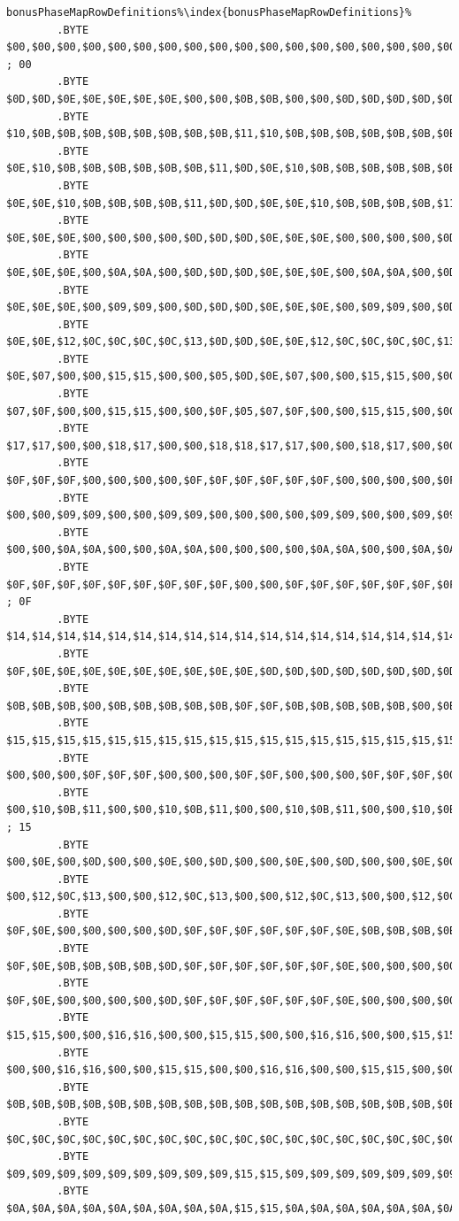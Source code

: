 \begin{lstlisting}[basicstyle=\tiny\ttfamily,escapechar=\%]
bonusPhaseMapRowDefinitions%\index{bonusPhaseMapRowDefinitions}%   
        .BYTE $00,$00,$00,$00,$00,$00,$00,$00,$00,$00,$00,$00,$00,$00,$00,$00,$00,$00,$00,$00 ; 00
        .BYTE $0D,$0D,$0E,$0E,$0E,$0E,$0E,$00,$00,$0B,$0B,$00,$00,$0D,$0D,$0D,$0D,$0D,$0E,$0E 
        .BYTE $10,$0B,$0B,$0B,$0B,$0B,$0B,$0B,$0B,$11,$10,$0B,$0B,$0B,$0B,$0B,$0B,$0B,$0B,$11
        .BYTE $0E,$10,$0B,$0B,$0B,$0B,$0B,$0B,$11,$0D,$0E,$10,$0B,$0B,$0B,$0B,$0B,$0B,$11,$0D
        .BYTE $0E,$0E,$10,$0B,$0B,$0B,$0B,$11,$0D,$0D,$0E,$0E,$10,$0B,$0B,$0B,$0B,$11,$0D,$0D
        .BYTE $0E,$0E,$0E,$00,$00,$00,$00,$0D,$0D,$0D,$0E,$0E,$0E,$00,$00,$00,$00,$0D,$0D,$0D
        .BYTE $0E,$0E,$0E,$00,$0A,$0A,$00,$0D,$0D,$0D,$0E,$0E,$0E,$00,$0A,$0A,$00,$0D,$0D,$0D
        .BYTE $0E,$0E,$0E,$00,$09,$09,$00,$0D,$0D,$0D,$0E,$0E,$0E,$00,$09,$09,$00,$0D,$0D,$0D
        .BYTE $0E,$0E,$12,$0C,$0C,$0C,$0C,$13,$0D,$0D,$0E,$0E,$12,$0C,$0C,$0C,$0C,$13,$0D,$0D
        .BYTE $0E,$07,$00,$00,$15,$15,$00,$00,$05,$0D,$0E,$07,$00,$00,$15,$15,$00,$00,$05,$0D
        .BYTE $07,$0F,$00,$00,$15,$15,$00,$00,$0F,$05,$07,$0F,$00,$00,$15,$15,$00,$00,$0F,$05
        .BYTE $17,$17,$00,$00,$18,$17,$00,$00,$18,$18,$17,$17,$00,$00,$18,$17,$00,$00,$18,$18
        .BYTE $0F,$0F,$0F,$00,$00,$00,$00,$0F,$0F,$0F,$0F,$0F,$0F,$00,$00,$00,$00,$0F,$0F,$0F
        .BYTE $00,$00,$09,$09,$00,$00,$09,$09,$00,$00,$00,$00,$09,$09,$00,$00,$09,$09,$00,$00
        .BYTE $00,$00,$0A,$0A,$00,$00,$0A,$0A,$00,$00,$00,$00,$0A,$0A,$00,$00,$0A,$0A,$00,$00
        .BYTE $0F,$0F,$0F,$0F,$0F,$0F,$0F,$0F,$0F,$00,$00,$0F,$0F,$0F,$0F,$0F,$0F,$0F,$0F,$0F ; 0F
        .BYTE $14,$14,$14,$14,$14,$14,$14,$14,$14,$14,$14,$14,$14,$14,$14,$14,$14,$14,$14,$14
        .BYTE $0F,$0E,$0E,$0E,$0E,$0E,$0E,$0E,$0E,$0E,$0D,$0D,$0D,$0D,$0D,$0D,$0D,$0D,$0D,$0F
        .BYTE $0B,$0B,$0B,$00,$0B,$0B,$0B,$0B,$0B,$0F,$0F,$0B,$0B,$0B,$0B,$0B,$00,$0B,$0B,$0B
        .BYTE $15,$15,$15,$15,$15,$15,$15,$15,$15,$15,$15,$15,$15,$15,$15,$15,$15,$15,$15,$15
        .BYTE $00,$00,$00,$0F,$0F,$0F,$00,$00,$00,$0F,$0F,$00,$00,$00,$0F,$0F,$0F,$00,$00,$00
        .BYTE $00,$10,$0B,$11,$00,$00,$10,$0B,$11,$00,$00,$10,$0B,$11,$00,$00,$10,$0B,$11,$00 ; 15 
        .BYTE $00,$0E,$00,$0D,$00,$00,$0E,$00,$0D,$00,$00,$0E,$00,$0D,$00,$00,$0E,$00,$0D,$00
        .BYTE $00,$12,$0C,$13,$00,$00,$12,$0C,$13,$00,$00,$12,$0C,$13,$00,$00,$12,$0C,$13,$00
        .BYTE $0F,$0E,$00,$00,$00,$00,$0D,$0F,$0F,$0F,$0F,$0F,$0F,$0E,$0B,$0B,$0B,$0B,$0D,$0F
        .BYTE $0F,$0E,$0B,$0B,$0B,$0B,$0D,$0F,$0F,$0F,$0F,$0F,$0F,$0E,$00,$00,$00,$00,$0D,$0F
        .BYTE $0F,$0E,$00,$00,$00,$00,$0D,$0F,$0F,$0F,$0F,$0F,$0F,$0E,$00,$00,$00,$00,$0D,$0F
        .BYTE $15,$15,$00,$00,$16,$16,$00,$00,$15,$15,$00,$00,$16,$16,$00,$00,$15,$15,$00,$00
        .BYTE $00,$00,$16,$16,$00,$00,$15,$15,$00,$00,$16,$16,$00,$00,$15,$15,$00,$00,$16,$16
        .BYTE $0B,$0B,$0B,$0B,$0B,$0B,$0B,$0B,$0B,$0B,$0B,$0B,$0B,$0B,$0B,$0B,$0B,$0B,$0B,$0B
        .BYTE $0C,$0C,$0C,$0C,$0C,$0C,$0C,$0C,$0C,$0C,$0C,$0C,$0C,$0C,$0C,$0C,$0C,$0C,$0C,$0C
        .BYTE $09,$09,$09,$09,$09,$09,$09,$09,$09,$15,$15,$09,$09,$09,$09,$09,$09,$09,$09,$09
        .BYTE $0A,$0A,$0A,$0A,$0A,$0A,$0A,$0A,$0A,$15,$15,$0A,$0A,$0A,$0A,$0A,$0A,$0A,$0A,$0A
\end{lstlisting}

